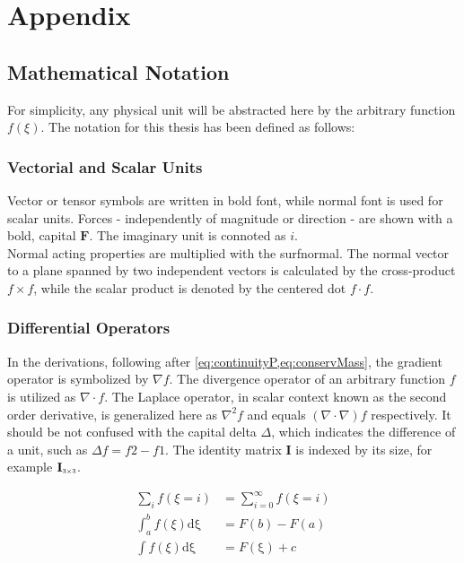 \chapter{Appendix}

\section{Mathematical Notation}
\label{sec:app:mathnot}
For simplicity, any physical unit will be abstracted here by the arbitrary function $f(\xi)$.
The notation for this thesis has been defined as follows: 
\subsection{Vectorial and Scalar Units}
Vector or tensor symbols are written in bold font, while normal font is used for scalar units. Forces - independently of magnitude or direction - are shown with a bold, capital $\mathbf{F}$. The imaginary unit is connoted as $i$.\\ Normal acting properties are multiplied with the \acrfull{surfnormal}. The normal vector to a plane spanned by two independent vectors is calculated by the cross-product $f \times f$, while the scalar product is denoted by the centered dot $f \cdot f$.
\subsection{Differential Operators}
In the derivations, following after \cref{eq:continuityP,eq:conservMass}, the gradient operator is symbolized by $\nabla f$. The divergence operator of an arbitrary function $f$ is utilized as $\nabla\cdot f$. The Laplace operator, in scalar context known as the second order derivative, is generalized here as $\nabla^2 f$ and equals $(\nabla\cdot\nabla) f$ respectively. It should be not confused with the capital delta $\Delta$, which indicates the difference of a unit, such as $\Delta f = f{2} - f{1}$. The identity matrix $\mathbf{I}$ is indexed by its size, for example $\mathbf{I}_{\scaleto{3 \times 3}{4pt}}$. 

\begin{align}
	\sum_{i} f(\xi = i)&= \sum_{i = 0}^{\infty} f(\xi = i) \label{eq:app:sum}\\
	\int_{a}^{b} f(\xi) \mathrm{d\xi} &= F(b) - F(a) \label{eq:app:intDef}\\
	\int f(\xi) \mathrm{d\xi}&= F(\mathrm{\xi}) + c \label{eq:app:intIndef}
\end{align}

